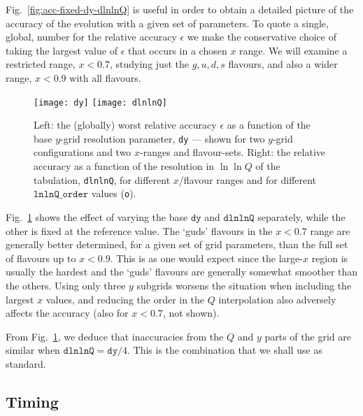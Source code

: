 \documentclass[12pt]{article}
\newcommand{\dy}{\ttt{dy}}
\newcommand{\dlnlnQ}{\ttt{dlnlnQ}}
\newcommand{\ttt}[1]{\texttt{#1}}
\begin{document}
Fig.~\ref{fig:acc-fixed-dy-dlnlnQ} is useful in order to obtain a
detailed picture of the accuracy of the evolution with a given set of
parameters. To quote a single, global, number for the relative 
accuracy $\epsilon$ we make
the conservative choice of taking the largest value of $\epsilon$ that
occurs in a chosen $x$ range. We will examine a restricted range,
$x<0.7$, studying just the $g,u,d,s$ flavours, and also a wider range,
$x<0.9$ with all flavours.

\begin{figure}
  \centering
  \texttt{[image: dy]}%
  \hfill
  \texttt{[image: dlnlnQ]}%
  \caption{Left: the (globally) worst relative accuracy $\epsilon$ as
    a function of the base $y$-grid resolution parameter, \ttt{dy} ---
    shown for two $y$-grid configurations and two $x$-ranges and
    flavour-sets.
  Right: the relative accuracy as a function of the
    resolution in $\ln \ln Q$ of the tabulation, \ttt{dlnlnQ}, for
    different $x$/flavour ranges and for different $\ttt{lnlnQ\_order}$
    values (\ttt{o}).}
  \label{fig:dy+dlnlnQ}
\end{figure}

Fig.~\ref{fig:dy+dlnlnQ} shows the effect of varying the base $\dy$
and $\dlnlnQ$ separately, while the other is fixed at the reference
value. The `guds' flavours in the $x<0.7$ range are generally better
determined, for a given set of grid parameters, than the full set of
flavours up to $x<0.9$. This is as one would expect since the
large-$x$ region is usually the hardest and the `guds' flavours are
generally somewhat smoother than the others. Using only three $y$
subgrids worsens the situation when including the largest $x$ values,
and reducing the order in the $Q$ interpolation also adversely affects
the accuracy (also for $x<0.7$, not shown).

From Fig.~\ref{fig:dy+dlnlnQ}, we deduce that inaccuracies from the
$Q$ and $y$ parts of the grid are similar when $\dlnlnQ = \dy /4$.
This is the combination that we shall use as standard.


\subsection{Timing}
\label{sec:Timing}
\end{document}
